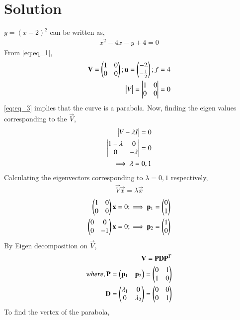 \documentclass[journal,12pt,twocolumn]{IEEEtran}
\begin{document}
\section{Solution}
$y=(x-2)^2$ can be written as,
\begin{align} \label{eq:eq_1}
    x^2-4x-y+4=0
\end{align}
From \eqref{eq:eq_1}, 
\begin{align} 
    \mathbf{V} = \begin{pmatrix}1 & 0 \\ 0 & 0\end{pmatrix};\mathbf{u} = \begin{pmatrix}-2 \\ -\frac{1}{2}\end{pmatrix};f=4 \label{eq:eq_2} \\
    \begin{vmatrix}V\end{vmatrix} = \begin{vmatrix}1 & 0 \\ 0 & 0\end{vmatrix} = 0 \label{eq:eq_3}
\end{align}
\eqref{eq:eq_3} implies that the curve is a parabola. Now, finding the eigen values corresponding to the $\vec{V}$,
\begin{align}
    \begin{vmatrix}V-\lambda I\end{vmatrix} = 0 \nonumber \\
    \begin{vmatrix}1-\lambda & 0 \\ 0 & -\lambda\end{vmatrix} = 0 \nonumber \\
    \implies \lambda=0,1 \label{eq:eq_4}
\end{align}
Calculating the eigenvectors corresponding to $\lambda=0,1$ respectively,
\begin{align}
    \vec{V}\vec{x} = \lambda\vec{x} \nonumber 
\end{align}
\begin{align}
    \begin{pmatrix}1 & 0 \\ 0 & 0\end{pmatrix}\mathbf{x} = 0;\implies \mathbf{p}_1 = \begin{pmatrix}0 \\ 1\end{pmatrix} \label{eq:eq_5} \\
    \begin{pmatrix}0 & 0 \\ 0 & -1\end{pmatrix}\mathbf{x} = 0;\implies \mathbf{p}_2 = \begin{pmatrix}1 \\ 0\end{pmatrix} \label{eq:eq_6}
\end{align}
By Eigen decomposition on $\vec{V}$,
\begin{align}
    \mathbf{V} = \mathbf{P}\mathbf{D}\mathbf{P}^T \nonumber \\
    where, \mathbf{P} = \begin{pmatrix}\mathbf{p}_1 & \mathbf{p}_2\end{pmatrix} = \begin{pmatrix}0 & 1 \\ 1 & 0\end{pmatrix} \label{eq:eq_7} \\
    \mathbf{D} = \begin{pmatrix}\lambda_1 & 0 \\ 0 & \lambda_2\end{pmatrix} = \begin{pmatrix}0 & 0 \\ 0 & 1\end{pmatrix} \label{eq:eq_8}
\end{align}
To find the vertex of the parabola,
\end{document}
